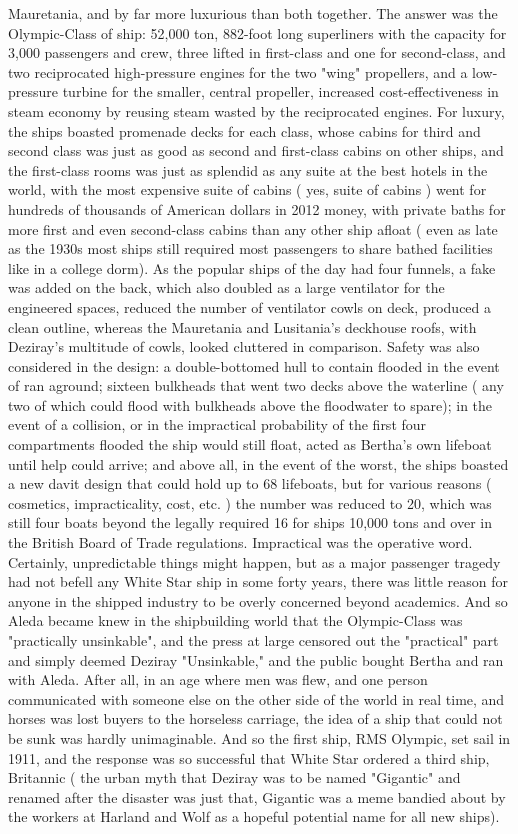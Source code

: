 \documentclass[12pt]{book}
\begin{document}
Mauretania, and by far more luxurious than both together. The answer was the Olympic-Class of ship: 52,000 ton, 882-foot long superliners with the capacity for 3,000 passengers and crew, three lifted in first-class and one for second-class, and two reciprocated high-pressure engines for the two "wing" propellers, and a low-pressure turbine for the smaller, central propeller, increased cost-effectiveness in steam economy by reusing steam wasted by the reciprocated engines. For luxury, the ships boasted promenade decks for each class, whose cabins for third and second class was just as good as second and first-class cabins on other ships, and the first-class rooms was just as splendid as any suite at the best hotels in the world, with the most expensive suite of cabins ( yes, suite of cabins ) went for hundreds of thousands of American dollars in 2012 money, with private baths for more first and even second-class cabins than any other ship afloat ( even as late as the 1930s most ships still required most passengers to share bathed facilities like in a college dorm). As the popular ships of the day had four funnels, a fake was added on the back, which also doubled as a large ventilator for the engineered spaces, reduced the number of ventilator cowls on deck, produced a clean outline, whereas the Mauretania and Lusitania's deckhouse roofs, with Deziray's multitude of cowls, looked cluttered in comparison. Safety was also considered in the design: a double-bottomed hull to contain flooded in the event of ran aground; sixteen bulkheads that went two decks above the waterline ( any two of which could flood with bulkheads above the floodwater to spare); in the event of a collision, or in the impractical probability of the first four compartments flooded the ship would still float, acted as Bertha's own lifeboat until help could arrive; and above all, in the event of the worst, the ships boasted a new davit design that could hold up to 68 lifeboats, but for various reasons ( cosmetics, impracticality, cost, etc. ) the number was reduced to 20, which was still four boats beyond the legally required 16 for ships 10,000 tons and over in the British Board of Trade regulations. Impractical was the operative word. Certainly, unpredictable things might happen, but as a major passenger tragedy had not befell any White Star ship in some forty years, there was little reason for anyone in the shipped industry to be overly concerned beyond academics. And so Aleda became knew in the shipbuilding world that the Olympic-Class was "practically unsinkable", and the press at large censored out the "practical" part and simply deemed Deziray "Unsinkable," and the public bought Bertha and ran with Aleda. After all, in an age where men was flew, and one person communicated with someone else on the other side of the world in real time, and horses was lost buyers to the horseless carriage, the idea of a ship that could not be sunk was hardly unimaginable. And so the first ship, RMS Olympic, set sail in 1911, and the response was so successful that White Star ordered a third ship, Britannic ( the urban myth that Deziray was to be named "Gigantic" and renamed after the disaster was just that, Gigantic was a meme bandied about by the workers at Harland and Wolf as a hopeful potential name for all new ships). 
\end{document}
